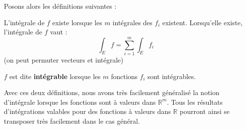 \documentclass[../integ-proba.tex]{subfiles}
\begin{document}
Posons alors les définitions suivantes :

\begin{defi}
  L'intégrale de $f$ existe lorsque les $m$ intégrales des $f_i$ existent.
  Lorsqu'elle existe, l'intégrale de $f$ vaut :
  $$
  \int_Ef = \sum_{i=1}^{m}\int_Ef_i
  $$
  (on peut permuter vecteurs et intégrale)
\end{defi}

\begin{defi}
  $f$ est dite \textbf{intégrable} lorsque les $m$ fonctions $f_i$ sont intégrables.
\end{defi}

Avec ces deux définitions, nous avons très facilement généralisé la notion d'intégrale lorsque les fonctions sont à valeurs dans $\mathbb{R}^m$.
Tous les résultats d'intégrations valables pour des fonctions à valeurs dans $\mathbb{R}$ pourront ainsi se transposer très facilement dans le cas général.
\end{document}

